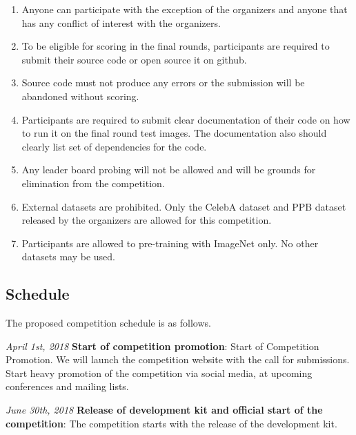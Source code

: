 \documentclass[11pt, oneside]{article}
\begin{document}
\begin{enumerate}
    \item Anyone can participate with the exception of the organizers and 
    anyone that has any conflict of interest with the organizers.
    \item To be eligible for scoring in the final rounds, participants are 
    required to submit their source code or open source it on github.
    \item Source code must not produce any errors or the submission will be 
    abandoned without scoring.
    \item Participants are required to submit clear documentation of their code 
    on how to run it on the final round test images. The documentation also 
    should clearly list set of dependencies for the code.
    \item Any leader board probing will not be allowed and will be grounds for 
    elimination from the competition.
    \item External datasets are prohibited.  Only the CelebA dataset and PPB 
    dataset released by the organizers are allowed for this competition.
    \item Participants are allowed to pre-training with ImageNet only.  No 
    other datasets may be used.
\end{enumerate}

\subsection{Schedule}

The proposed competition schedule is as follows.

{\it April 1st, 2018} {\bf Start of competition promotion}: Start of 
Competition Promotion. We will launch the competition website with the call for 
submissions. Start heavy promotion of the competition via social media, at 
upcoming conferences and mailing lists.

{\it June 30th, 2018} {\bf Release of development kit and official start of the 
	competition}: The competition starts with the release of the development 
kit.
\end{document}
